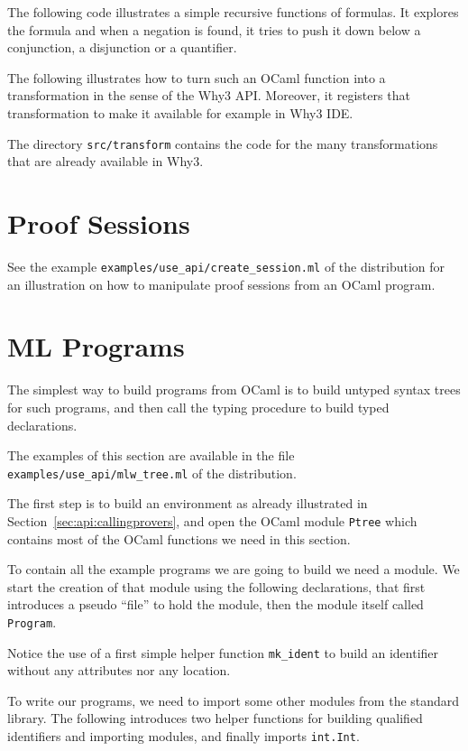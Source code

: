 The following code illustrates a simple recursive functions of
formulas. It explores the formula and when a negation is found, it
tries to push it down below a conjunction, a disjunction or a
quantifier.


The following illustrates how to turn such an OCaml function into a
transformation in the sense of the Why3 API. Moreover, it registers that
transformation to make it available for example in Why3 IDE.


The directory \verb|src/transform| contains the code for the many
transformations that are already available in Why3.

\section{Proof Sessions}

See the example \verb|examples/use_api/create_session.ml| of the
distribution for an illustration on how to manipulate proof sessions
from an OCaml program.

\section{ML Programs}

The simplest way to build \whyml programs from OCaml is to build
untyped syntax trees for such programs, and then
call the \why typing procedure to build typed declarations.

The examples of this section are available in the file
\verb|examples/use_api/mlw_tree.ml| of the distribution.

The first step is to build an environment as already illustrated in
Section~\ref{sec:api:callingprovers}, and open the OCaml module
\verb|Ptree| which contains most of the OCaml functions we need in
this section.


To contain all the example programs we are going to build we need a
module. We start the creation of that module using the following
declarations, that first introduces a pseudo ``file'' to hold the
module, then the module itself called \verb|Program|.

Notice the use of a first
simple helper function \verb|mk_ident| to build an identifier without
any attributes nor any location.

To write our programs, we need to import some other modules from the
standard library. The following introduces two helper functions for
building qualified identifiers and importing modules, and finally
imports \verb|int.Int|.


